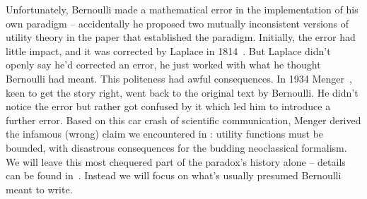 Unfortunately, Bernoulli made a mathematical error in the implementation 
of his own paradigm -- accidentally he proposed two mutually inconsistent versions of utility theory in the paper that established the paradigm. Initially, the error had little impact, and it was corrected by Laplace in 
1814~\cite{Laplace1814}. But Laplace didn't openly say he'd corrected an error, he just worked with what he thought Bernoulli had meant. This politeness had awful consequences. In
1934 Menger~\cite{Menger1934}, keen to get the story right, went back to the original text by Bernoulli. He didn't notice the error but rather got confused by it which led him to introduce a further error. Based on this car crash of scientific communication, Menger derived the infamous (wrong) claim we encountered in : utility functions must be bounded, with disastrous consequences for the budding neoclassical formalism. We 
will leave this most chequered part of the paradox's history alone -- details can be found 
in~\cite{PetersGell-Mann2016}. Instead we will focus on what's usually 
presumed Bernoulli meant to write.

